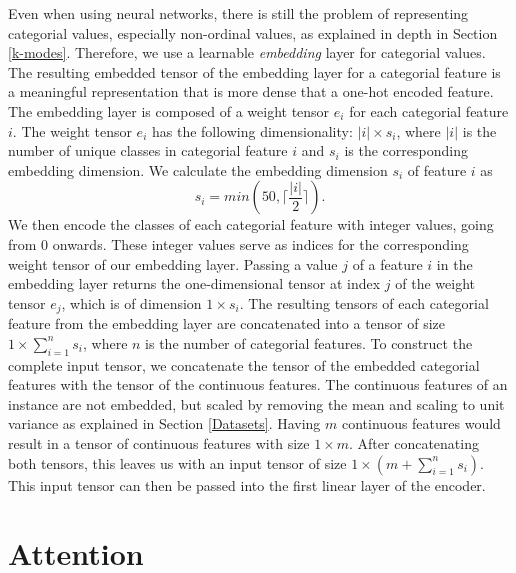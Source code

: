 Even when using neural networks, there is still the problem of representing categorial values, especially non-ordinal values, as explained in depth in Section \ref{k-modes}. Therefore, we use a learnable \textit{embedding} layer for categorial values. The resulting embedded tensor of the embedding layer for a categorial feature is a meaningful representation that is more dense that a one-hot encoded feature. The embedding layer is composed of a weight tensor $e_i$ for each categorial feature $i$. The weight tensor $e_i$  has the following dimensionality: $|i| \times s_i$, where $|i|$ is the number of unique classes in categorial feature $i$ and $s_i$ is the corresponding embedding dimension. We calculate the embedding dimension $s_i$ of feature $i$ as
$$s_i = min(50, \lceil \frac{|i|}{2} \rceil).$$
We then encode the classes of each categorial feature with integer values, going from 0 onwards. These integer values serve as indices for the corresponding weight tensor of our embedding layer. Passing a value $j$ of a feature $i$ in the embedding layer returns the one-dimensional tensor at index $j$ of the weight tensor $e_j$, which is of dimension $1 \times s_i$. The resulting tensors of each categorial feature from the embedding layer are concatenated into a tensor of size $1 \times \sum^n_{i=1}s_i$, where $n$ is the number of categorial features. To construct the complete input tensor, we concatenate the tensor of the embedded categorial features with the tensor of the continuous features. The continuous features of an instance are not embedded, but scaled by removing the mean and scaling to unit variance as explained in Section \ref{Datasets}. Having $m$ continuous features would result in a tensor of continuous features with size $1 \times m$. After concatenating both tensors, this leaves us with an input tensor of size $1 \times (m + \sum^n_{i=1}s_i)$. This input tensor can then be passed into the first linear layer of the encoder.

\section{Attention}

